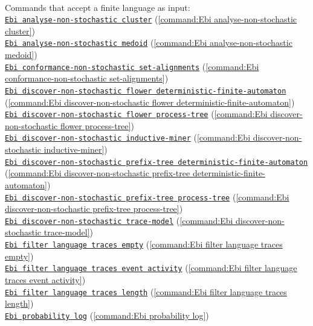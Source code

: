 {\\Commands that accept a finite language as input: \\\null\qquad\hyperref[command:Ebi analyse-non-stochastic cluster]{\texttt{Ebi analyse-non-stochastic cluster}} (\cref{command:Ebi analyse-non-stochastic cluster})\\\null\qquad\hyperref[command:Ebi analyse-non-stochastic medoid]{\texttt{Ebi analyse-non-stochastic medoid}} (\cref{command:Ebi analyse-non-stochastic medoid})\\\null\qquad\hyperref[command:Ebi conformance-non-stochastic set-alignments]{\texttt{Ebi conformance-non-stochastic set-alignments}} (\cref{command:Ebi conformance-non-stochastic set-alignments})\\\null\qquad\hyperref[command:Ebi discover-non-stochastic flower deterministic-finite-automaton]{\texttt{Ebi discover-non-stochastic flower deterministic-finite-automaton}} (\cref{command:Ebi discover-non-stochastic flower deterministic-finite-automaton})\\\null\qquad\hyperref[command:Ebi discover-non-stochastic flower process-tree]{\texttt{Ebi discover-non-stochastic flower process-tree}} (\cref{command:Ebi discover-non-stochastic flower process-tree})\\\null\qquad\hyperref[command:Ebi discover-non-stochastic inductive-miner]{\texttt{Ebi discover-non-stochastic inductive-miner}} (\cref{command:Ebi discover-non-stochastic inductive-miner})\\\null\qquad\hyperref[command:Ebi discover-non-stochastic prefix-tree deterministic-finite-automaton]{\texttt{Ebi discover-non-stochastic prefix-tree deterministic-finite-automaton}} (\cref{command:Ebi discover-non-stochastic prefix-tree deterministic-finite-automaton})\\\null\qquad\hyperref[command:Ebi discover-non-stochastic prefix-tree process-tree]{\texttt{Ebi discover-non-stochastic prefix-tree process-tree}} (\cref{command:Ebi discover-non-stochastic prefix-tree process-tree})\\\null\qquad\hyperref[command:Ebi discover-non-stochastic trace-model]{\texttt{Ebi discover-non-stochastic trace-model}} (\cref{command:Ebi discover-non-stochastic trace-model})\\\null\qquad\hyperref[command:Ebi filter language traces empty]{\texttt{Ebi filter language traces empty}} (\cref{command:Ebi filter language traces empty})\\\null\qquad\hyperref[command:Ebi filter language traces event activity]{\texttt{Ebi filter language traces event activity}} (\cref{command:Ebi filter language traces event activity})\\\null\qquad\hyperref[command:Ebi filter language traces length]{\texttt{Ebi filter language traces length}} (\cref{command:Ebi filter language traces length})\\\null\qquad\hyperref[command:Ebi probability log]{\texttt{Ebi probability log}} (\cref{command:Ebi probability log})
}
